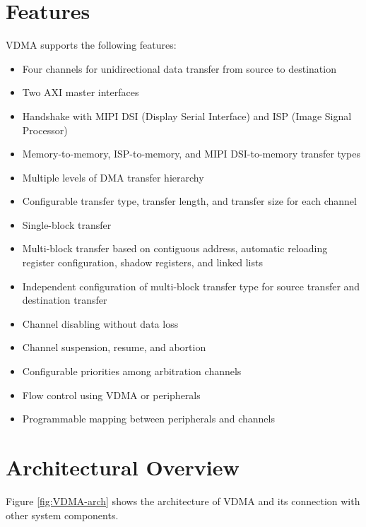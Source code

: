 \documentclass[main\_\_EN.tex]{subfiles}
\begin{document}

\section{Features}

VDMA supports the following features:

\begin{itemize}
    \item Four channels for unidirectional data transfer from source to destination
    \item Two AXI master interfaces
    \item Handshake with MIPI DSI (Display Serial Interface) and ISP (Image Signal Processor)
    \item Memory-to-memory, ISP-to-memory, and MIPI DSI-to-memory transfer types
    \item Multiple levels of DMA transfer hierarchy
    \item Configurable transfer type, transfer length, and transfer size for each channel
    \item Single-block transfer
    \item Multi-block transfer based on contiguous address, automatic reloading register configuration, shadow registers, and linked lists
    \item Independent configuration of multi-block transfer type for source transfer and destination transfer
    \item Channel disabling without data loss
    \item Channel suspension, resume, and abortion
    \item Configurable priorities among arbitration channels
    \item Flow control using VDMA or peripherals
    \item Programmable mapping between peripherals and channels
\end{itemize}



\section{Architectural Overview}
\label{sec:vdma-arch-overview}

Figure \ref{fig:VDMA-arch} shows the architecture of VDMA and its connection with other system components.
\end{document}
